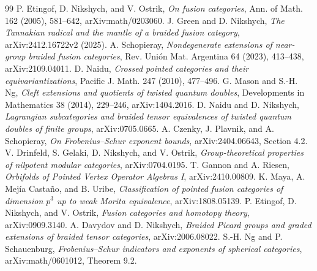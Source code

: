 \documentclass[11pt]{amsart}
\theoremstyle{definition}\newtheorem{definition}[theorem]{Definition}
\begin{document}
\begin{thebibliography}{99}
 P. Etingof, D. Nikshych, and V. Ostrik,
\emph{On fusion categories}, Ann. of Math. 162 (2005), 581--642,
arXiv:math/0203060.
 J. Green and D. Nikshych,
\emph{The Tannakian radical and the mantle of a braided fusion category},
arXiv:2412.16722v2 (2025).
 A. Schopieray,
\emph{Nondegenerate extensions of near-group braided fusion categories},
Rev. Uni\'on Mat. Argentina 64 (2023), 413--438, arXiv:2109.04011.
 D. Naidu, \emph{Crossed pointed categories and their
equivariantizations}, Pacific J. Math. 247 (2010), 477--496.
 G. Mason and S.-H. Ng,
\emph{Cleft extensions and quotients of twisted quantum doubles},
Developments in Mathematics 38 (2014), 229--246, arXiv:1404.2016.
 D. Naidu and D. Nikshych,
\emph{Lagrangian subcategories and braided tensor equivalences of twisted
quantum doubles of finite groups}, arXiv:0705.0665.
 A. Czenky, J. Plavnik, and A. Schopieray,
\emph{On Frobenius--Schur exponent bounds}, arXiv:2404.06643, Section 4.2.
 V. Drinfeld, S. Gelaki, D. Nikshych, and V. Ostrik,
\emph{Group-theoretical properties of nilpotent modular categories},
arXiv:0704.0195.
 T. Gannon and A. Riesen, \emph{Orbifolds of Pointed Vertex Operator
Algebras I}, arXiv:2410.00809.
 K. Maya, A. Mej\'ia Casta\~no, and B. Uribe,
\emph{Classification of pointed fusion categories of dimension $p^3$ up to weak
Morita equivalence}, arXiv:1808.05139.
 P. Etingof, D. Nikshych, and V. Ostrik,
\emph{Fusion categories and homotopy theory}, arXiv:0909.3140.
 A. Davydov and D. Nikshych,
\emph{Braided Picard groups and graded extensions of braided tensor categories},
arXiv:2006.08022.
 S.-H. Ng and P. Schauenburg,
\emph{Frobenius--Schur indicators and exponents of spherical categories},
arXiv:math/0601012, Theorem 9.2.
\end{thebibliography}
\end{document}
